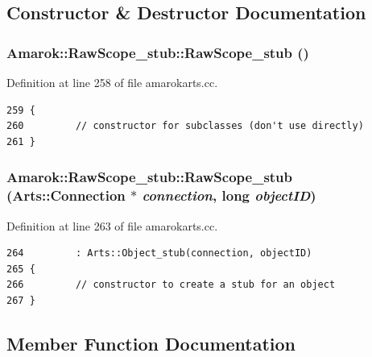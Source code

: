 \subsection{Constructor \& Destructor Documentation}
\subsubsection{\setlength{\rightskip}{0pt plus 5cm}Amarok::Raw\-Scope\_\-stub::Raw\-Scope\_\-stub ()\hspace{0.3cm}{\tt  [protected]}}\label{classAmarok_1_1RawScope__stub_Amarok_1_1RawScope__stubb0}




Definition at line 258 of file amarokarts.cc.



\footnotesize\begin{verbatim}259 {
260         // constructor for subclasses (don't use directly)
261 }
\end{verbatim}\normalsize 
{}
\subsubsection{\setlength{\rightskip}{0pt plus 5cm}Amarok::Raw\-Scope\_\-stub::Raw\-Scope\_\-stub (Arts::Connection $\ast$ {\em connection}, long {\em object\-ID})}\label{classAmarok_1_1RawScope__stub_Amarok_1_1RawScope__stuba0}




Definition at line 263 of file amarokarts.cc.



\footnotesize\begin{verbatim}264         : Arts::Object_stub(connection, objectID)
265 {
266         // constructor to create a stub for an object
267 }
\end{verbatim}\normalsize 


\subsection{Member Function Documentation}
